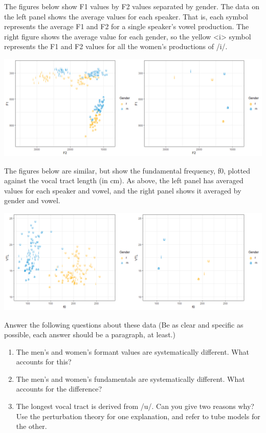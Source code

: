 \documentclass[12pt, letterpaper]{article}
\begin{document}
The figures below show F1 values by F2 values separated by gender. The data on the left panel shows the average values for each speaker. That is, each symbol represents the average F1 and F2 for a single speaker's vowel production. The right figure shows the average value for each gender, so the yellow <i> symbol represents the F1 and F2 values for all the women’s productions of /i/.

\begin{center}
    \includegraphics[width = \textwidth]{figs/vowel_data.jpg}
\end{center}

The figures below are similar, but show the fundamental frequency, f0, plotted against the vocal tract length (in cm). As above, the left panel has averaged values for each speaker and vowel, and the right panel shows it averaged by gender and vowel.

\begin{center}
    \includegraphics[width = \textwidth]{figs/vtl.png}
\end{center}

Answer the following questions about these data (Be as clear and specific as possible, each answer should be a paragraph, at least.)

\begin{enumerate}
    \item The men’s and women’s formant values are systematically different. What accounts for this?
    \item The men’s and women’s fundamentals are systematically different. What accounts for the difference?
    \item The longest vocal tract is derived from /u/. Can you give two reasons why? Use the perturbation theory for one explanation, and refer to tube models for the other.
\end{enumerate}
\end{document}
